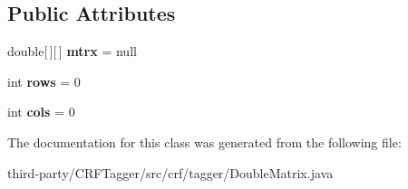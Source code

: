\subsection*{Public Attributes}
\begin{DoxyCompactItemize}
\item 
\hypertarget{classcrf_1_1tagger_1_1DoubleMatrix_a991574caee0c1fef50c6b78a3ae2e173}{
double\mbox{[}$\,$\mbox{]}\mbox{[}$\,$\mbox{]} {\bfseries mtrx} = null}
\label{classcrf_1_1tagger_1_1DoubleMatrix_a991574caee0c1fef50c6b78a3ae2e173}

\item 
\hypertarget{classcrf_1_1tagger_1_1DoubleMatrix_ac623f2820a83a4abe6da7d9863b88667}{
int {\bfseries rows} = 0}
\label{classcrf_1_1tagger_1_1DoubleMatrix_ac623f2820a83a4abe6da7d9863b88667}

\item 
\hypertarget{classcrf_1_1tagger_1_1DoubleMatrix_a48747b6e20eb0e7ae5251ee6cad4f34d}{
int {\bfseries cols} = 0}
\label{classcrf_1_1tagger_1_1DoubleMatrix_a48747b6e20eb0e7ae5251ee6cad4f34d}

\end{DoxyCompactItemize}


The documentation for this class was generated from the following file:\begin{DoxyCompactItemize}
\item 
third-\/party/CRFTagger/src/crf/tagger/DoubleMatrix.java\end{DoxyCompactItemize}

